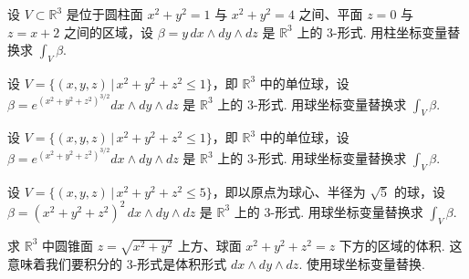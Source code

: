 \begin{question}\label{q:7-38}
设 $V\subset\mathbb{R}^3$ 是位于圆柱面 $x^2+y^2=1$ 与 $x^2+y^2=4$ 之间、平面 $z=0$ 与 $z=x+2$ 之间的区域，设 $\beta=y\,dx\wedge dy\wedge dz$ 是 $\mathbb{R}^3$ 上的 3-形式. 用柱坐标变量替换求 $\int_V\beta$.
\end{question}

\begin{question}\label{q:7-39}
设 $V=\bigl\{(x,y,z)\,\bigl|\,x^2+y^2+z^2\leq 1\bigr\}$，即 $\mathbb{R}^3$ 中的单位球，设 $\beta=e^{(x^2+y^2+z^2)^{3/2}}dx\wedge dy\wedge dz$ 是 $\mathbb{R}^3$ 上的 3-形式. 用球坐标变量替换求 $\int_V\beta$.
\end{question}

\begin{question}\label{q:7-40}
设 $V=\bigl\{(x,y,z)\,\bigl|\,x^2+y^2+z^2\leq 1\bigr\}$，即 $\mathbb{R}^3$ 中的单位球，设 $\beta=e^{(x^2+y^2+z^2)^{3/2}}dx\wedge dy\wedge dz$ 是 $\mathbb{R}^3$ 上的 3-形式. 用球坐标变量替换求 $\int_V\beta$.
\end{question}

\begin{question}\label{q:7-41}
设 $V=\bigl\{(x,y,z)\,\bigl|\,x^2+y^2+z^2\leq 5\bigr\}$，即以原点为球心、半径为 $\sqrt{5}$ 的球，设 $\beta=(x^2+y^2+z^2)^2\,dx\wedge dy\wedge dz$ 是 $\mathbb{R}^3$ 上的 3-形式. 用球坐标变量替换求 $\int_V\beta$.
\end{question}

\begin{question}\label{q:7-42}
求 $\mathbb{R}^3$ 中圆锥面 $z=\sqrt{x^2+y^2}$ 上方、球面 $x^2+y^2+z^2=z$ 下方的区域的体积. 这意味着我们要积分的 3-形式是体积形式 $dx\wedge dy\wedge dz$. 使用球坐标变量替换.
\end{question}
